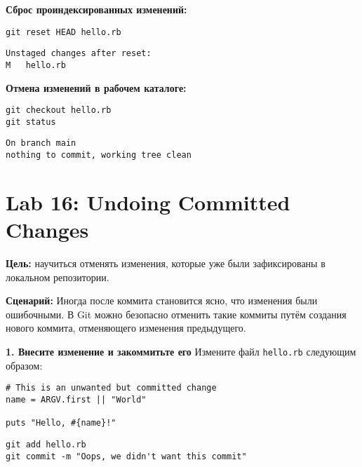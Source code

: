 \documentclass[a4paper,12pt]{report}
\begin{document}
\textbf{Сброс проиндексированных изменений:}
\begin{verbatim}
git reset HEAD hello.rb
\end{verbatim}
\begin{verbatim}
Unstaged changes after reset:
M	hello.rb
\end{verbatim}


\textbf{Отмена изменений в рабочем каталоге:}
\begin{verbatim}
git checkout hello.rb
git status
\end{verbatim}
\begin{verbatim}
On branch main
nothing to commit, working tree clean
\end{verbatim}


\section{Lab 16: Undoing Committed Changes}
\textbf{Цель:} научиться отменять изменения, которые уже были зафиксированы в локальном репозитории.

\textbf{Сценарий:}
Иногда после коммита становится ясно, что изменения были ошибочными. В Git можно безопасно отменить такие коммиты путём создания нового коммита, отменяющего изменения предыдущего.

\textbf{1. Внесите изменение и закоммитьте его}
Измените файл \texttt{hello.rb} следующим образом:
\begin{verbatim}
# This is an unwanted but committed change
name = ARGV.first || "World"

puts "Hello, #{name}!"
\end{verbatim}

\begin{verbatim}
git add hello.rb
git commit -m "Oops, we didn't want this commit"
\end{verbatim}

\end{document}
